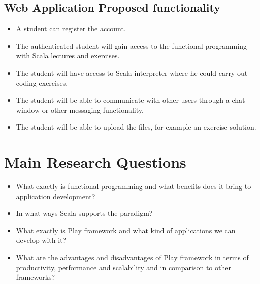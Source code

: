 \documentclass[12pt,twoside,a4paper]{report}
\begin{document}
\subsection{Web Application Proposed functionality}\label{1.2.1}
\begin{itemize}\itemsep1pt \parskip0pt 
\item A student can register the account.
\item The authenticated student will gain access to the functional programming with Scala lectures and exercises.
\item The student will have access to Scala interpreter where he could carry out coding exercises.
\item The student will be able to communicate with other users through a chat window or other messaging functionality.
\item The student will be able to upload the files, for example an exercise solution.
\end{itemize}

\section{Main Research Questions}\label{1.3}
\begin{itemize}\itemsep1pt \parskip0pt 
\item What exactly is functional programming and what benefits does it bring to application development?
\item In what ways Scala supports the paradigm?
\item What exactly is Play framework and what kind of applications we can develop with it?
\item What are the advantages and disadvantages of Play framework in terms of productivity, performance and scalability and in comparison to other frameworks?
\end{itemize}

\end{document}
